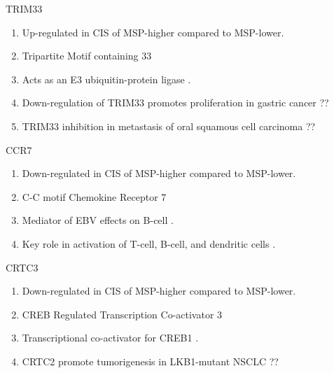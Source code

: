 \documentclass{beamer}
\begin{document}
\begin{frame}[allowframebreaks]
         \begin{block}{TRIM33}
            \begin{enumerate}
                \item Up-regulated in CIS of MSP-higher compared to MSP-lower.
                \item Tripartite Motif containing 33
                \item Acts as an E3 ubiquitin-protein ligase \cite{TRIM33-1}.
                \item Down-regulation of TRIM33 promotes proliferation in gastric cancer \cite{TRIM33-2} ??
                \item TRIM33 inhibition in metastasis of oral squamous cell carcinoma \cite{TRIM33-3} ??
            \end{enumerate}
        \end{block}

         \begin{block}{CCR7}
            \begin{enumerate}
                \item Down-regulated in CIS of MSP-higher compared to MSP-lower.
                \item C-C motif Chemokine Receptor 7
                \item Mediator of EBV effects on B-cell \cite{CCR7-1}.
                \item Key role in activation of T-cell, B-cell, and dendritic cells \cite{CCR7-2}.
            \end{enumerate}
        \end{block}

        \begin{block}{CRTC3}
            \begin{enumerate}
                \item Down-regulated in CIS of MSP-higher compared to MSP-lower.
                \item CREB Regulated Transcription Co-activator 3
                \item Transcriptional co-activator for CREB1 \cite{CRTC3-1}.
                \item CRTC2 promote tumorigenesis in LKB1-mutant NSCLC \cite{CRTC3-2} ??
            \end{enumerate}
        \end{block}


\end{frame}
\end{document}
